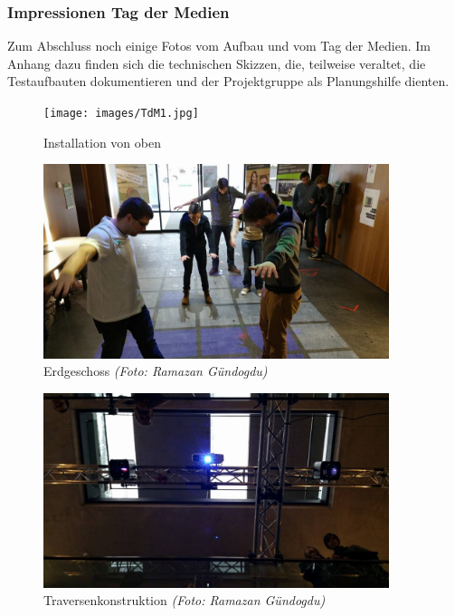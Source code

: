 
\subsubsection{Impressionen Tag der Medien}
Zum Abschluss noch einige Fotos vom Aufbau und vom Tag der Medien. Im Anhang dazu finden sich die technischen Skizzen, die, teilweise veraltet, die Testaufbauten dokumentieren und der Projektgruppe als Planungshilfe dienten.

\begin{figure}[htbp]
	\centering
		\texttt{[image: images/TdM1.jpg]}
	\caption{Installation von oben}
	\label{fig:TdM1}
\end{figure}

\begin{figure}[htbp]
	\centering
		\includegraphics[width=0.9\textwidth]{images/TdM2.jpg}
	\caption{Erdgeschoss \textit{(Foto: Ramazan Gündogdu)}}
	\label{fig:TdM2}
\end{figure}

\begin{figure}[htbp]
	\centering
		\includegraphics[width=0.9\textwidth]{images/TdM3.jpg}
	\caption{Traversenkonstruktion \textit{(Foto: Ramazan Gündogdu)}}
	\label{fig:TdM3}
\end{figure}

